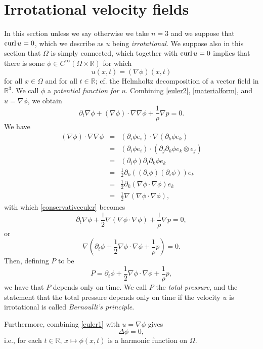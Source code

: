 \documentclass{article}
\newcommand{\curl}{\ensuremath\mathrm{curl}\,}
\theoremstyle{definition}
\begin{document}
\section{Irrotational velocity fields}
In this section unless we say otherwise we take $n=3$ and we suppose that $\curl u =0$, which we describe as   $u$ being {\em irrotational}.
We suppose also in this section that $\Omega$ is simply connected,
which together with $\curl u=0$ implies that there is some 
 $\phi \in C^\infty(\Omega \times \mathbb{R})$ for which
\[
u(x,t) = (\nabla \phi)(x,t)
\]
for all $x \in \Omega$ and for all $t \in \mathbb{R}$; cf. the Helmholtz decomposition of a vector field in $\mathbb{R}^3$. We call $\phi$ a {\em potential function for $u$}.
Combining \eqref{euler2}, \eqref{materialform}, and $u=\nabla \phi$, we obtain
\begin{equation}
\partial_t \nabla \phi + (\nabla \phi)\cdot \nabla \nabla \phi + \frac{1}{\rho} \nabla p =0.
\label{conservativeeuler}
\end{equation}
We have
\begin{eqnarray*}
(\nabla \phi)\cdot \nabla \nabla \phi&=&(\partial_i \phi e_i) \cdot \nabla (\partial_k \phi e_k)\\
&=&(\partial_i \phi e_i)  \cdot (\partial_j \partial_k \phi e_k \otimes e_j)\\
&=&(\partial_i \phi)\partial_i \partial_k \phi e_k\\
&=&\frac{1}{2}\partial_k (( \partial_i \phi)(\partial_i \phi))e_k\\
&=&\frac{1}{2}\partial_k (\nabla \phi \cdot \nabla \phi) e_k\\
&=&\frac{1}{2}\nabla(\nabla \phi \cdot \nabla \phi),
\end{eqnarray*}
with which \eqref{conservativeeuler} becomes
\[
\partial_t \nabla \phi + \frac{1}{2}\nabla(\nabla \phi \cdot \nabla \phi) + \frac{1}{\rho}\nabla p=0,
\]
or
\[
\nabla\left( \partial_t \phi+ \frac{1}{2}\nabla\phi \cdot \nabla \phi+\frac{1}{\rho}p\right)=0.
\]
Then, defining $P$ to be
\[
P =  \partial_t \phi+ \frac{1}{2}\nabla\phi \cdot \nabla \phi+\frac{1}{\rho}p,
\]
we have that $P$ depends only on time. We call $P$ the {\em total pressure}, and the statement that the total pressure
depends only on time if the velocity $u$ is irrotational is called {\em Bernoulli's principle}. 

Furthermore, combining \eqref{euler1} with $u=\nabla \phi$ gives
\[
\Delta \phi = 0,
\]
i.e., for each $t \in \mathbb{R}$, $x \mapsto \phi(x,t)$ is a harmonic function on $\Omega$. 
\end{document}
